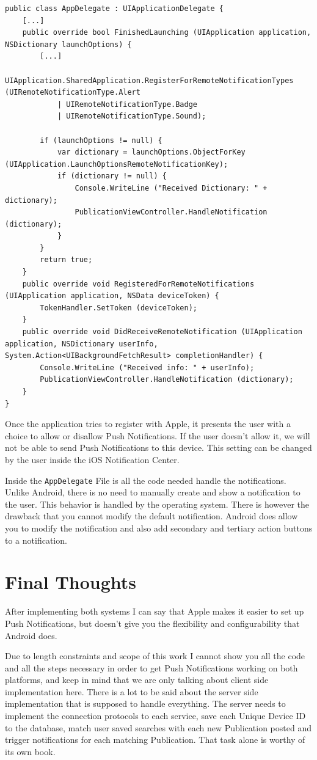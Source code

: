\begin{lstlisting}[frame=lt,caption=Modified AppDelegate, label={list:reg_ios}]
public class AppDelegate : UIApplicationDelegate {
	[...]
	public override bool FinishedLaunching (UIApplication application, NSDictionary launchOptions) {
		[...]
		UIApplication.SharedApplication.RegisterForRemoteNotificationTypes (UIRemoteNotificationType.Alert 
			| UIRemoteNotificationType.Badge 
			| UIRemoteNotificationType.Sound);

		if (launchOptions != null) {
			var dictionary = launchOptions.ObjectForKey (UIApplication.LaunchOptionsRemoteNotificationKey);
			if (dictionary != null) {
				Console.WriteLine ("Received Dictionary: " + dictionary);
				PublicationViewController.HandleNotification (dictionary);			
			}
		}		
		return true;
	}
	public override void RegisteredForRemoteNotifications (UIApplication application, NSData deviceToken) {
		TokenHandler.SetToken (deviceToken);
	}
	public override void DidReceiveRemoteNotification (UIApplication application, NSDictionary userInfo, System.Action<UIBackgroundFetchResult> completionHandler) {
		Console.WriteLine ("Received info: " + userInfo);
		PublicationViewController.HandleNotification (dictionary);
	}
}
\end{lstlisting}

Once the application tries to register with Apple, it presents the user with a choice to allow or disallow Push Notifications. If the user doesn't allow it, we will not be able to send Push Notifications to this device. This setting can be changed by the user inside the iOS Notification Center.

Inside the \texttt{AppDelegate} File is all the code needed handle the notifications. Unlike Android, there is no need to manually create and show a notification to the user. This behavior is handled by the operating system. There is however the drawback that you cannot modify the default notification. Android does allow you to modify the notification and also add secondary and tertiary action buttons to a notification.

\section{Final Thoughts}

After implementing both systems I can say that Apple makes it easier to set up Push Notifications, but doesn't give you the flexibility and configurability that Android does. 

Due to length constraints and scope of this work I cannot show you all the code and all the steps necessary in order to get Push Notifications working on both platforms, and keep in mind that we are only talking about client side implementation here. There is a lot to be said about the server side implementation that is supposed to handle everything. The server needs to implement the connection protocols to each service, save each Unique Device ID to the database, match user saved searches with each new Publication posted and trigger notifications for each matching Publication. That task alone is worthy of its own book.


 





